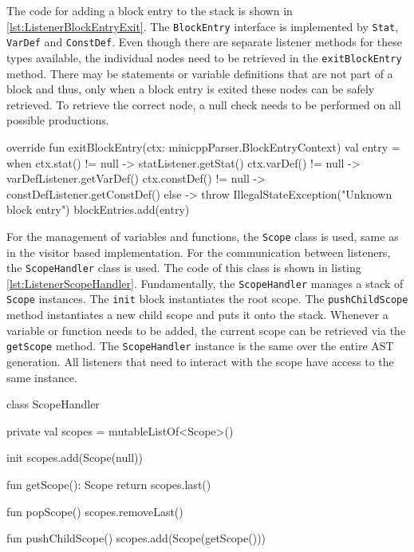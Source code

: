 The code for adding a block entry to the stack is shown in \ref{lst:ListenerBlockEntryExit}. The \verb|BlockEntry| interface is implemented by \verb|Stat|, \verb|VarDef| and \verb|ConstDef|. Even though there are separate listener methods for these types available, the individual nodes need to be retrieved in the \verb|exitBlockEntry| method. There may be statements or variable definitions that are not part of a block and thus, only when a block entry is exited these nodes can be safely retrieved. To retrieve the correct node, a null check needs to be performed on all possible productions. 


\begin{KotlinCode}[float,numbers=none,caption=Implementation of the \texttt{exitBlockEntry} method., label=lst:ListenerBlockEntryExit]
    override fun exitBlockEntry(ctx: minicppParser.BlockEntryContext) {
        val entry = when {
            ctx.stat() != null -> statListener.getStat()
            ctx.varDef() != null -> varDefListener.getVarDef()
            ctx.constDef() != null -> constDefListener.getConstDef()
            else -> throw IllegalStateException("Unknown block entry")
        }
        blockEntries.add(entry)
    }
\end{KotlinCode}

For the management of variables and functions, the \verb|Scope| class is used, same as in the visitor based implementation. For the communication between listeners, the \verb|ScopeHandler| class is used. The code of this class is shown in listing \ref{lst:ListenerScopeHandler}. Fundamentally, the \verb|ScopeHandler| manages a stack of \verb|Scope| instances. The \verb|init| block instantiates the root scope. The \verb|pushChildScope| method instantiates a new child scope and puts it onto the stack. Whenever a variable or function needs to be added, the current scope can be retrieved via the \verb|getScope| method. The \verb|ScopeHandler| instance is the same over the entire AST generation. All listeners that need to interact with the scope have access to the same instance. 


\begin{KotlinCode}[float,numbers=none,caption=Implementation of the \texttt{ScopeHandler} class., label=lst:ListenerScopeHandler]
class ScopeHandler {

    private val scopes = mutableListOf<Scope>()

    init {
        scopes.add(Scope(null))
    }

    fun getScope(): Scope {
        return scopes.last()
    }

    fun popScope() {
        scopes.removeLast()
    }

    fun pushChildScope() {
        scopes.add(Scope(getScope()))
    }
}
\end{KotlinCode}

